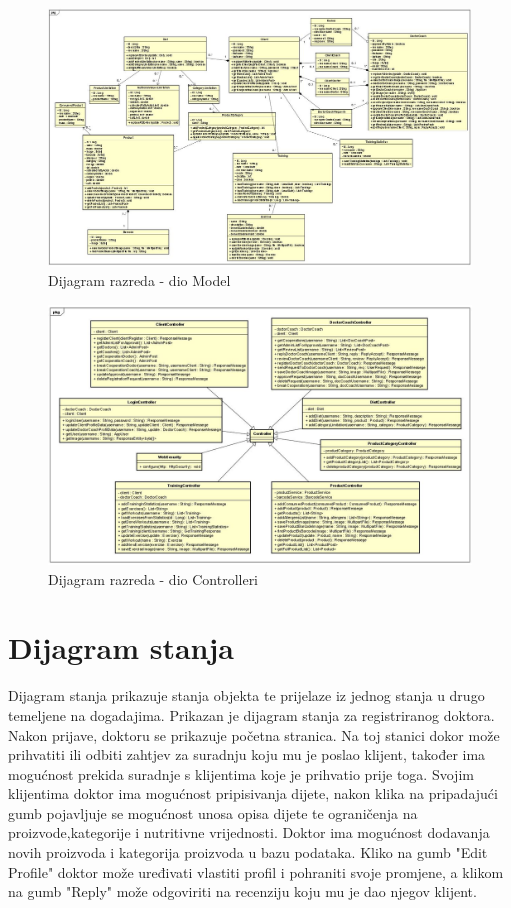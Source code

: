 			
			\begin{figure}[H]
			\includegraphics[scale=0.65]{dijagrami/Model}
			\centering
			\caption{Dijagram razreda - dio Model}
			\label{fig:promjene}
			\end{figure}
			\begin{figure}[H]
			\includegraphics[scale=0.65]{dijagrami/Controller}
			\centering
			\caption{Dijagram razreda - dio Controlleri}
			\label{fig:promjene}
			\end{figure}
			
			
			
			\eject
		
		\section{Dijagram stanja}
		
		
		
		Dijagram stanja prikazuje stanja objekta te prijelaze iz jednog stanja u drugo temeljene na dogadajima. Prikazan je dijagram stanja za registriranog
			doktora. Nakon prijave, doktoru se prikazuje početna stranica. Na toj stanici dokor može prihvatiti ili odbiti zahtjev za suradnju koju mu je poslao klijent, također ima mogućnost prekida suradnje s klijentima koje je prihvatio prije toga. Svojim klijentima doktor ima mogućnost pripisivanja dijete, nakon klika na pripadajući gumb pojavljuje se mogućnost unosa opisa dijete te ograničenja na proizvode,kategorije i nutritivne vrijednosti. Doktor ima mogućnost dodavanja novih proizvoda i kategorija proizvoda u bazu podataka. Kliko na gumb "Edit Profile" doktor može uređivati vlastiti profil i pohraniti svoje promjene, a klikom na gumb "Reply" može odgoviriti na recenziju koju mu je dao njegov klijent. 
		
